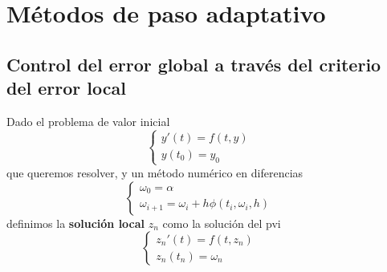 \section{Métodos de paso adaptativo}

\subsection{Control del error global a través del criterio del error local}

\begin{definition}
Dado el problema de valor inicial 
$$
\left\{
\begin{array}{lll}
y'(t) = f(t,y) & & \\
y(t_0) = y_0 & &
\end{array}
\right.
$$
 que queremos resolver, y un método numérico en diferencias
\begin{equation}
\label{eq6}
\left\{
\begin{array}{lll}
\omega_0 = \alpha & & \\
\omega_{i+1} = \omega_i + h \phi(t_i, \omega_i, h) & & 
\end{array}
\right.
\end{equation}
definimos la \textbf{solución local} $z_n$ como la solución del pvi
$$
\left\{
\begin{array}{lll}
z_n'(t) = f(t,z_n) & & \\
z_n(t_n) = \omega_n & &
\end{array}
\right.
$$
\end{definition}

